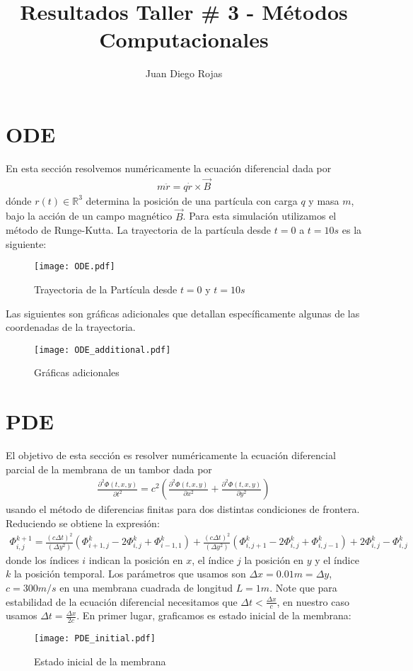 \documentclass{article}
\title{Resultados Taller \# 3 - Métodos Computacionales}
\author{Juan Diego Rojas}
\begin{document}
	\maketitle
	\section{ODE}
	En esta sección resolvemos numéricamente la ecuación diferencial dada por
	\begin{align*}
		m\ddot{r} = q\dot{r}\times \vec{B}
	\end{align*}
	dónde $r(t) \in \mathbb{R}^3$ determina la posición de una partícula con carga $q$ y masa $m$, bajo la acción de un campo magnético $\vec{B}$. Para esta simulación utilizamos el método de Runge-Kutta. La trayectoria de la partícula desde $t = 0$ a $t = 10s$ es la siguiente:
	\begin{figure}[H]
		\centering
		\texttt{[image: ODE.pdf]}
		\caption{Trayectoria de la Partícula desde $t=0$ y $t=10s$}
		\label{fig:ODE}
	\end{figure}
	Las siguientes son gráficas adicionales que detallan específicamente algunas de las coordenadas de la trayectoria.
	\begin{figure}[H]
		\centering
		\texttt{[image: ODE\_additional.pdf]}
		\caption{Gráficas adicionales}
		\label{fig:ODE_additional}
	\end{figure}
	\section{PDE}
	El objetivo de esta sección es resolver numéricamente la ecuación diferencial parcial de la membrana de un tambor dada por
	\begin{align*}
		\frac{\partial^2 \Phi(t,x,y)}{\partial t^2} = c^2\left(\frac{\partial^2 \Phi(t,x,y)}{\partial x^2} + \frac{\partial^2 \Phi(t,x,y)}{\partial y^2}\right)
	\end{align*}
	usando el método de diferencias finitas para dos distintas condiciones de frontera. Reduciendo se obtiene la expresión:
	\begin{align*}
		\Phi^{k+1}_{i,j} = \frac{(c\Delta t)^2}{(\Delta y^2)}\left(\Phi_{i+1,j}^{k} - 2\Phi_{i,j}^{k} + \Phi_{i-1,1}^{k}\right) + \frac{(c\Delta t)^2}{(\Delta y^2)}\left(\Phi_{i,j+1}^{k} - 2\Phi_{i,j}^{k} + \Phi_{i,j-1}^{k}\right) + 2\Phi_{i,j}^{k} - \Phi_{i,j}^{k}
	\end{align*}
	donde los índices $i$ indican la posición en $x$, el índice $j$ la posición en $y$ y el índice $k$ la posición temporal. Los parámetros que usamos son $\Delta x = 0.01m = \Delta y$, $c=300 m/s$ en una membrana cuadrada de longitud $L=1m$. Note que para estabilidad de la ecuación diferencial necesitamos que $\Delta t < \frac{\Delta x}{c}$, en nuestro caso usamos $\Delta t =  \frac{\Delta x}{2c}$. En primer lugar, graficamos es estado inicial de la membrana:
	\begin{figure}[H]
		\centering
		\texttt{[image: PDE\_initial.pdf]}
		\caption{Estado inicial de la membrana}
		\label{fig:PDE_initiall}
	\end{figure}
\end{document}
